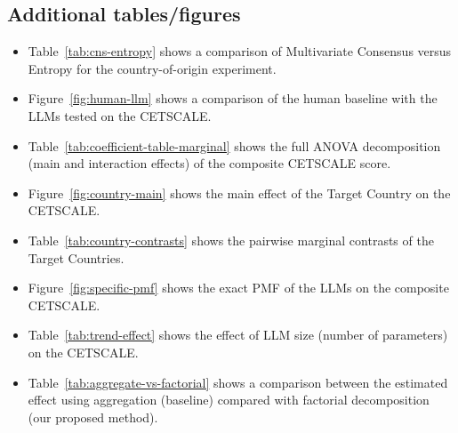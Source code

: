 \subsection{Additional tables/figures}

\begin{itemize}
  \item Table~\ref{tab:cns-entropy} shows a comparison of Multivariate Consensus versus Entropy for the country-of-origin experiment.
  \item Figure~\ref{fig:human-llm} shows a comparison of the human baseline with the LLMs tested on the CETSCALE.
  \item Table~\ref{tab:coefficient-table-marginal} shows the full ANOVA decomposition (main and interaction effects) of the composite CETSCALE score.
  \item Figure~\ref{fig:country-main} shows the main effect of the Target Country on the CETSCALE.
  \item Table~\ref{tab:country-contrasts} shows the pairwise marginal contrasts of the Target Countries.
  \item Figure~\ref{fig:specific-pmf} shows the exact PMF of the LLMs on the composite CETSCALE.
  \item Table~\ref{tab:trend-effect} shows the effect of LLM size (number of parameters) on the CETSCALE.
  \item Table~\ref{tab:aggregate-vs-factorial} shows a comparison between the estimated effect using aggregation (baseline) compared with factorial decomposition (our proposed method).
\end{itemize}
 





